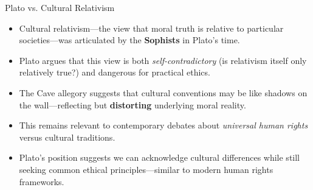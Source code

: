\documentclass[aspectratio=169]{beamer}
\begin{document}
\begin{frame}{Plato vs. Cultural Relativism}
\begin{itemize}
\item Cultural relativism—the view that moral truth is relative to particular societies—was articulated by the \textbf{Sophists} in Plato's time.
\item Plato argues that this view is both \emph{self-contradictory} (is relativism itself only relatively true?) and dangerous for practical ethics.
\item The Cave allegory suggests that cultural conventions may be like shadows on the wall—reflecting but \textbf{distorting} underlying moral reality.
\item This remains relevant to contemporary debates about \emph{universal human rights} versus cultural traditions.
\item Plato's position suggests we can acknowledge cultural differences while still seeking common ethical principles—similar to modern human rights frameworks.
\end{itemize}
\end{frame}
\end{document}
